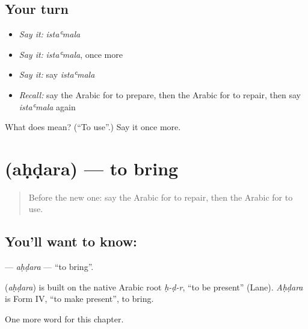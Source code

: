 \subsection*{Your turn}
\begin{itemize}
\raggedright
  \item \emph{Say it:} \emph{istaʿmala}
  \item \emph{Say it:} \emph{istaʿmala}, once more
  \item \emph{Say it:} say \emph{istaʿmala}
  \item \emph{Recall:} say the Arabic for to prepare, then the Arabic for to repair, then say \emph{istaʿmala} again
\end{itemize}

\begin{tcolorbox}[breakable,colback=teal!4,colframe=teal!35!black,title={Before you move on}]
What does  mean? (\textquotedblleft{}To use\textquotedblright{}.) Say it once more.
\end{tcolorbox}
\section[\texorpdfstring{\ar{أحضر} (aḥḍara)}{أحضر (aḥḍara)}]{ (aḥḍara) — to bring}

\label{lesson:AR-C225-ahdara}



\begin{quote}
Before the new one: say the Arabic for to repair, then the Arabic for to use.
\end{quote}

\subsection*{You'll want to know: }
\textbf{} — \emph{aḥḍara} — \textquotedblleft{}to bring\textquotedblright{}.

\begin{cousinweb}
\textbf{} (\emph{aḥḍara}) is built on the native Arabic root \emph{ḥ-ḍ-r}, \textquotedblleft{}to be present\textquotedblright{} (Lane). \emph{Aḥḍara} is Form IV, \textquotedblleft{}to make present\textquotedblright{}, to bring.
\end{cousinweb}

\begin{grammarlens}[title={What you've built}]
One more word for this chapter.
\end{grammarlens}

